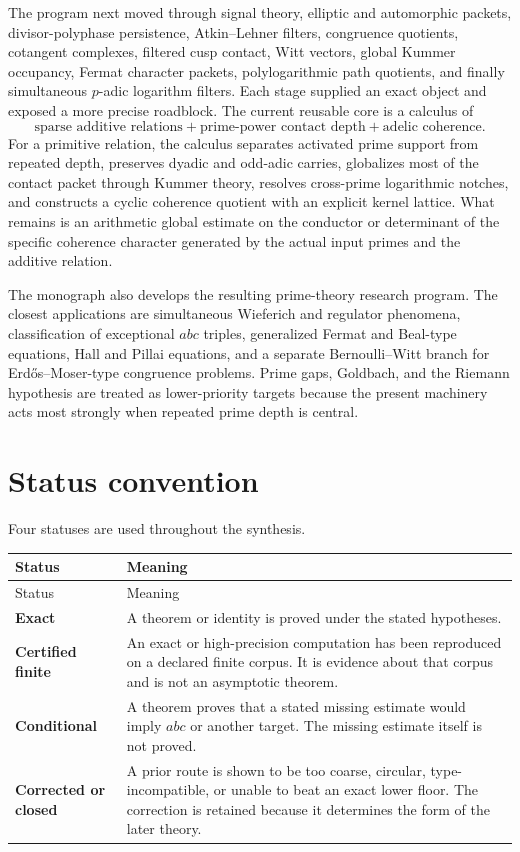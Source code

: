 The program next moved through signal theory, elliptic and automorphic packets, divisor-polyphase persistence, Atkin--Lehner filters, congruence quotients, cotangent complexes, filtered cusp contact, Witt vectors, global Kummer occupancy, Fermat character packets, polylogarithmic path quotients, and finally simultaneous $p$-adic logarithm filters. Each stage supplied an exact object and exposed a more precise roadblock. The current reusable core is a calculus of
\[
\boxed{
\text{sparse additive relations}
+
\text{prime-power contact depth}
+
\text{adelic coherence}.
}
\]
For a primitive relation, the calculus separates activated prime support from repeated depth, preserves dyadic and odd-adic carries, globalizes most of the contact packet through Kummer theory, resolves cross-prime logarithmic notches, and constructs a cyclic coherence quotient with an explicit kernel lattice. What remains is an arithmetic global estimate on the conductor or determinant of the specific coherence character generated by the actual input primes and the additive relation.

The monograph also develops the resulting prime-theory research program. The closest applications are simultaneous Wieferich and regulator phenomena, classification of exceptional $abc$ triples, generalized Fermat and Beal-type equations, Hall and Pillai equations, and a separate Bernoulli--Witt branch for Erd\H{o}s--Moser-type congruence problems. Prime gaps, Goldbach, and the Riemann hypothesis are treated as lower-priority targets because the present machinery acts most strongly when repeated prime depth is central.

\chapter*{Status convention}
Four statuses are used throughout the synthesis.

\begin{longtable}{L{0.18\textwidth}L{0.72\textwidth}}
\toprule
Status & Meaning\\
\midrule
\endfirsthead
\toprule
Status & Meaning\\
\midrule
\endhead
\textbf{Exact} & A theorem or identity is proved under the stated hypotheses.\\
\textbf{Certified finite} & An exact or high-precision computation has been reproduced on a declared finite corpus. It is evidence about that corpus and is not an asymptotic theorem.\\
\textbf{Conditional} & A theorem proves that a stated missing estimate would imply $abc$ or another target. The missing estimate itself is not proved.\\
\textbf{Corrected or closed} & A prior route is shown to be too coarse, circular, type-incompatible, or unable to beat an exact lower floor. The correction is retained because it determines the form of the later theory.\\
\bottomrule
\end{longtable}

